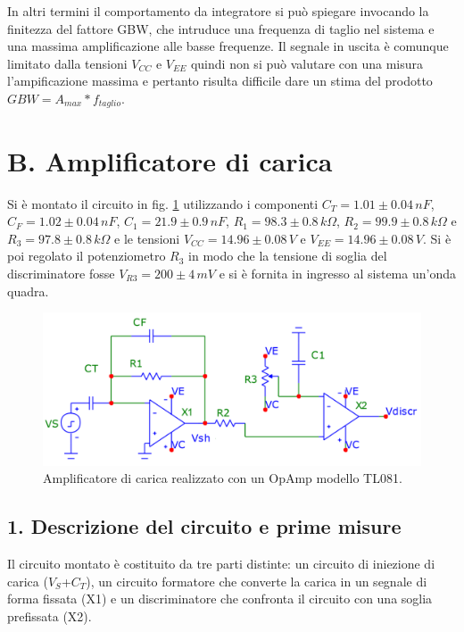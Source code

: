 \documentclass[10pt,a4paper]{article}
\begin{document}
In altri termini il comportamento da integratore si può spiegare invocando la finitezza del fattore GBW, che intruduce una frequenza di taglio nel sistema e una massima amplificazione alle basse frequenze. Il segnale in uscita è comunque limitato dalla tensioni $V_{CC}$ e $V_{EE}$ quindi non si può valutare con una misura l'ampificazione massima e pertanto risulta difficile dare un stima del prodotto $GBW = A_{max} * f_{taglio}$.

\section*{B. Amplificatore di carica}

Si è montato il circuito in fig. \ref{circuito2} utilizzando i componenti $C_T = 1.01\pm0.04 \, nF$, $C_F = 1.02 \pm 0.04 \, nF$, $C_1 = 21.9 \pm 0.9 \, nF$, $R_1 = 98.3 \pm 0.8 \, k \Omega$, $R_2 = 99.9 \pm 0.8 \, k\Omega$ e $R_3 = 97.8 \pm 0.8 \, k \Omega$ e le tensioni $V_{CC} = 14.96\pm0.08 \, V$ e $V_{EE} = 14.96 \pm 0.08 \, V$. Si è poi regolato il potenziometro $R_3$ in modo che la tensione di soglia del discriminatore fosse $V_{R3} = 200 \pm 4 \, mV$ e si è fornita in ingresso al sistema un'onda quadra.\\

\begin{figure}[h]
\centering
\includegraphics[scale=0.5]{amplificatoreCarica.png}
\caption{Amplificatore di carica realizzato con un OpAmp modello TL081.\label{circuito2}}
\end{figure}

\subsection*{1. Descrizione del circuito e prime misure}
Il circuito montato è costituito da tre parti distinte: un circuito di iniezione di carica ($V_S$+$C_T$), un circuito formatore che converte la carica in un segnale di forma fissata (X1) e un discriminatore che confronta il circuito con una soglia prefissata (X2).
\end{document}
